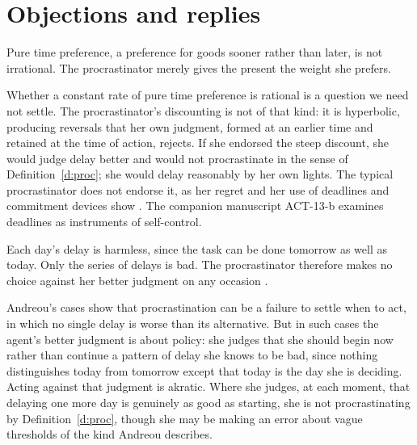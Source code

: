 \documentclass{situationist-preprint}
\begin{document}
\section{Objections and replies}

\begin{objection}
Pure time preference, a preference for goods sooner rather than later, is not irrational. The procrastinator merely gives the present the weight she prefers.
\end{objection}

\begin{reply}
Whether a constant rate of pure time preference is rational is a question we need not settle. The procrastinator's discounting is not of that kind: it is hyperbolic, producing reversals that her own judgment, formed at an earlier time and retained at the time of action, rejects. If she endorsed the steep discount, she would judge delay better and would not procrastinate in the sense of Definition~\ref{d:proc}; she would delay reasonably by her own lights. The typical procrastinator does not endorse it, as her regret and her use of deadlines and commitment devices show \citep{Ainslie1992}. The companion manuscript ACT-13-b examines deadlines as instruments of self-control.
\end{reply}

\begin{objection}
Each day's delay is harmless, since the task can be done tomorrow as well as today. Only the series of delays is bad. The procrastinator therefore makes no choice against her better judgment on any occasion \citep{Andreou2007}.
\end{objection}

\begin{reply}
Andreou's cases show that procrastination can be a failure to settle when to act, in which no single delay is worse than its alternative. But in such cases the agent's better judgment is about policy: she judges that she should begin now rather than continue a pattern of delay she knows to be bad, since nothing distinguishes today from tomorrow except that today is the day she is deciding. Acting against that judgment is akratic. Where she judges, at each moment, that delaying one more day is genuinely as good as starting, she is not procrastinating by Definition~\ref{d:proc}, though she may be making an error about vague thresholds of the kind Andreou describes.
\end{reply}
\end{document}
